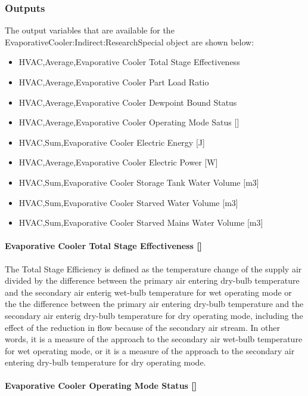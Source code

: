 \subsubsection{Outputs}\label{outputs-4-004}

The output variables that are available for the EvaporativeCooler:Indirect:ResearchSpecial object are shown below:

\begin{itemize}
\item
  HVAC,Average,Evaporative Cooler Total Stage Effectiveness
\item
  HVAC,Average,Evaporative Cooler Part Load Ratio
\item
  HVAC,Average,Evaporative Cooler Dewpoint Bound Status
\item
  HVAC,Average,Evaporative Cooler Operating Mode Satus {[]}
\item
  HVAC,Sum,Evaporative Cooler Electric Energy {[}J{]}
\item
  HVAC,Average,Evaporative Cooler Electric Power {[}W{]}
\item
  HVAC,Sum,Evaporative Cooler Storage Tank Water Volume {[}m3{]}
\item
  HVAC,Sum,Evaporative Cooler Starved Water Volume {[}m3{]}
\item
  HVAC,Sum,Evaporative Cooler Starved Mains Water Volume {[}m3{]}
\end{itemize}

\paragraph{Evaporative Cooler Total Stage Effectiveness {[]}}\label{evaporative-cooler-total-stage-effectiveness-2}

The Total Stage Efficiency is defined as the temperature change of the supply air divided by the difference between the primary air entering dry-bulb temperature and the secondary air enterig wet-bulb temperature for wet operating mode or the the difference between the primary air entering dry-bulb temperature and the secondary air enterig dry-bulb temperature for dry operating mode, including the effect of the reduction in flow because of the secondary air stream. In other words, it is a measure of the approach to the secondary air wet-bulb temperature for wet operating mode, or it is a measure of the approach to the secondary air entering dry-bulb temperature for dry operating mode.

\paragraph{Evaporative Cooler Operating Mode Status {[]}}\label{evaporative-cooler-operating-mode-status}

